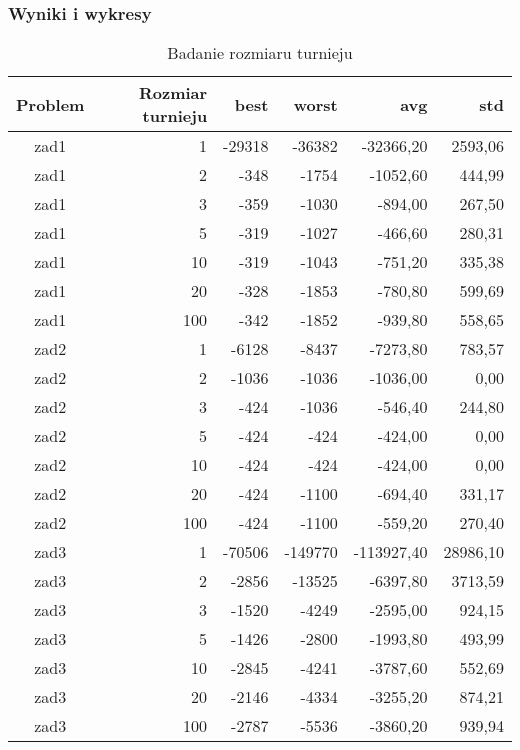 \documentclass[12pt,a4paper]{article}
\begin{document}
\subsubsection{Wyniki i wykresy}
\begin{table}[htbp]
  \centering
    \begin{tabular}{crrrrr}
    \multicolumn{1}{p{4.855em}}{\textbf{Problem}} & \multicolumn{1}{p{7.715em}}{\textbf{Rozmiar turnieju}} & \multicolumn{1}{p{4.785em}}{\textbf{best}} & \multicolumn{1}{p{4.785em}}{\textbf{worst}} & \multicolumn{1}{p{5em}}{\textbf{avg}} & \multicolumn{1}{p{3.93em}}{\textbf{std}} \\
    \midrule
    zad1  & 1     & -29318 & -36382 & -32366,20 & 2593,06 \\
    zad1  & 2     & -348  & -1754 & -1052,60 & 444,99 \\
    zad1  & 3     & -359  & -1030 & -894,00 & 267,50 \\
    zad1  & 5     & -319  & -1027 & -466,60 & 280,31 \\
    zad1  & 10    & -319  & -1043 & -751,20 & 335,38 \\
    zad1  & 20    & -328  & -1853 & -780,80 & 599,69 \\
    zad1  & 100   & -342  & -1852 & -939,80 & 558,65 \\
    \midrule
    zad2  & 1     & -6128 & -8437 & -7273,80 & 783,57 \\
    zad2  & 2     & -1036 & -1036 & -1036,00 & 0,00 \\
    zad2  & 3     & -424  & -1036 & -546,40 & 244,80 \\
    zad2  & 5     & -424  & -424  & -424,00 & 0,00 \\
    zad2  & 10    & -424  & -424  & -424,00 & 0,00 \\
    zad2  & 20    & -424  & -1100 & -694,40 & 331,17 \\
    zad2  & 100   & -424  & -1100 & -559,20 & 270,40 \\
    \midrule
    zad3  & 1     & -70506 & -149770 & -113927,40 & 28986,10 \\
    zad3  & 2     & -2856 & -13525 & -6397,80 & 3713,59 \\
    zad3  & 3     & -1520 & -4249 & -2595,00 & 924,15 \\
    zad3  & 5     & -1426 & -2800 & -1993,80 & 493,99 \\
    zad3  & 10    & -2845 & -4241 & -3787,60 & 552,69 \\
    zad3  & 20    & -2146 & -4334 & -3255,20 & 874,21 \\
    zad3  & 100   & -2787 & -5536 & -3860,20 & 939,94 \\
    \end{tabular}%
  \label{tab:addlabel}%
  \caption{Badanie rozmiaru turnieju}
\end{table}%
\end{document}
